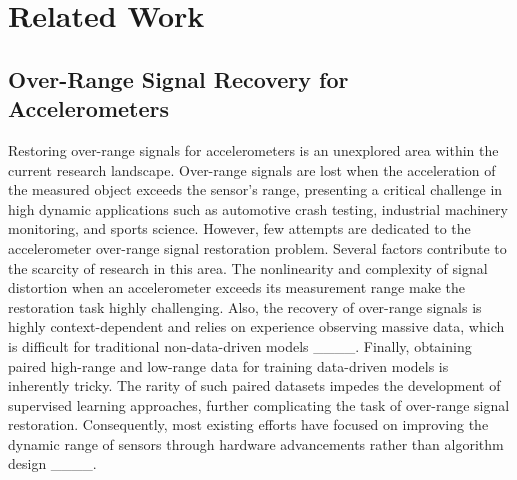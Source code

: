 \section{Related Work}
\subsection{Over-Range Signal Recovery for Accelerometers}
Restoring over-range signals for accelerometers is an unexplored area within the current research landscape. Over-range signals are lost when the acceleration of the measured object exceeds the sensor's range, presenting a critical challenge in high dynamic applications such as automotive crash testing, industrial machinery monitoring, and sports science. However, few attempts are dedicated to the accelerometer over-range signal restoration problem.
Several factors contribute to the scarcity of research in this area. The nonlinearity and complexity of signal distortion when an accelerometer exceeds its measurement range make the restoration task highly challenging. Also, the recovery of over-range signals is highly context-dependent and relies on experience observing massive data, which is difficult for traditional non-data-driven models ____. Finally, obtaining paired high-range and low-range data for training data-driven models is inherently tricky. The rarity of such paired datasets impedes the development of supervised learning approaches, further complicating the task of over-range signal restoration. Consequently, most existing efforts have focused on improving the dynamic range of sensors through hardware advancements rather than algorithm design ____.

